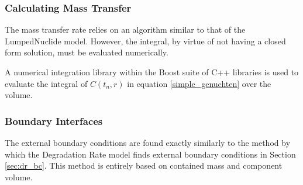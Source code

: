 \subsubsection{Calculating Mass Transfer}
The mass transfer rate relies on an algorithm similar to that of the 
LumpedNuclide model. However, the integral, by virtue of not having a closed 
form solution, must be evaluated numerically. 

A numerical integration library within the Boost suite of C++ libraries is used 
to evaluate the integral of $C(t_n, r)$ in equation \eqref{simple_genuchten} over the volume.


\subsubsection{Boundary Interfaces}
The external boundary conditions are found exactly similarly to the method by 
which the Degradation Rate model finds external boundary conditions in Section 
\ref{sec:dr_bc}. This method is entirely based on contained mass and component 
volume.  
